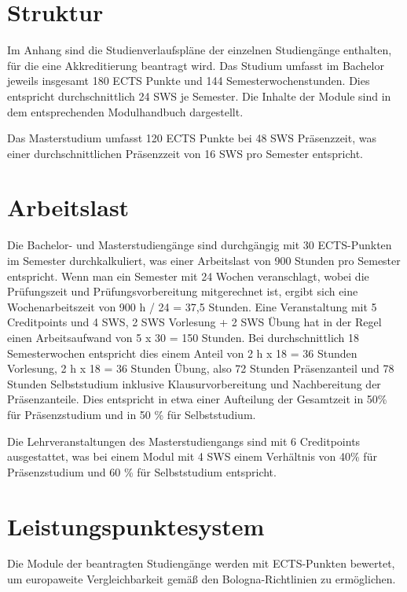 \section{Struktur}\label{struktur}

Im Anhang sind die Studienverlaufspläne der einzelnen Studiengänge
enthalten, für die eine Akkreditierung beantragt wird. Das Studium
umfasst im Bachelor jeweils insgesamt 180 ECTS Punkte und 144
Semesterwochenstunden. Dies entspricht durchschnittlich 24 SWS je
Semester. Die Inhalte der Module sind in dem entsprechenden
Modulhandbuch dargestellt.

Das Masterstudium umfasst 120 ECTS Punkte bei 48 SWS Präsenzzeit, was
einer durchschnittlichen Präsenzzeit von 16 SWS pro Semester entspricht.

\section{Arbeitslast}\label{arbeitslast}

Die Bachelor- und Masterstudiengänge sind durchgängig mit 30
ECTS-Punkten im Semester durchkalkuliert, was einer Arbeitslast von 900
Stunden pro Semester entspricht. Wenn man ein Semester mit 24 Wochen
veranschlagt, wobei die Prüfungszeit und Prüfungsvorbereitung
mitgerechnet ist, ergibt sich eine Wochenarbeitszeit von 900 h / 24 =
37,5 Stunden. Eine Veranstaltung mit 5 Creditpoints und 4 SWS, 2 SWS
Vorlesung + 2 SWS Übung hat in der Regel einen Arbeitsaufwand von 5 x 30
= 150 Stunden. Bei durchschnittlich 18 Semesterwochen entspricht dies
einem Anteil von 2 h x 18 = 36 Stunden Vorlesung, 2 h x 18 = 36 Stunden
Übung, also 72 Stunden Präsenzanteil und 78 Stunden Selbststudium
inklusive Klausurvorbereitung und Nachbereitung der Präsenzanteile. Dies
entspricht in etwa einer Aufteilung der Gesamtzeit in 50\% für
Präsenzstudium und in 50 \% für Selbststudium.

Die Lehrveranstaltungen des Masterstudiengangs sind mit 6 Creditpoints
ausgestattet, was bei einem Modul mit 4 SWS einem Verhältnis von 40\%
für Präsenzstudium und 60 \% für Selbststudium entspricht.

\section{Leistungspunktesystem}\label{leistungspunktesystem}

Die Module der beantragten Studiengänge werden mit ECTS-Punkten
bewertet, um europaweite Vergleichbarkeit gemäß den Bologna-Richtlinien
zu ermöglichen.

